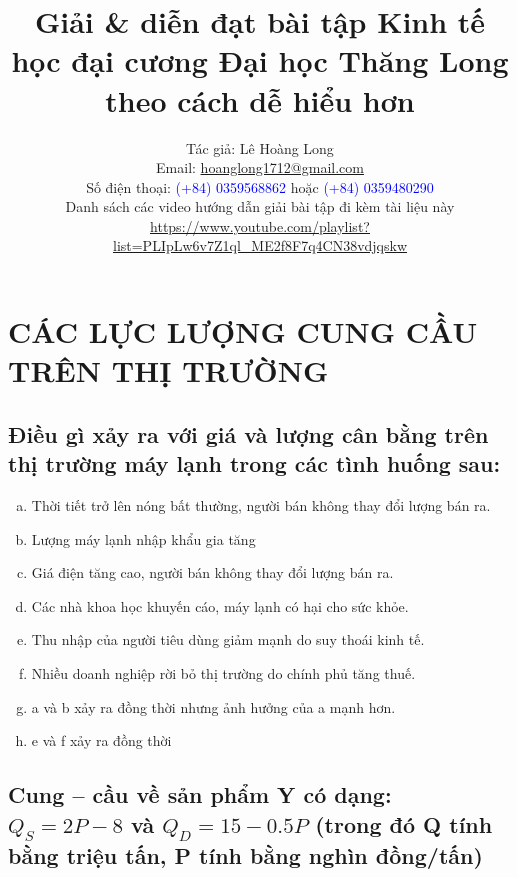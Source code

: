 \documentclass{report}
\title{Giải \& diễn đạt bài tập Kinh tế học đại cương Đại học Thăng Long theo cách dễ hiểu hơn
}
\author{Tác giả: Lê Hoàng Long \\ Email: \href{mailto:hoanglong1712@gmail.com}{hoanglong1712@gmail.com} 
\\ Số điện thoại: \textcolor{blue}{(+84) 0359568862} 
hoặc \textcolor{blue}{(+84) 0359480290} \\
Danh sách các video hướng dẫn giải bài tập đi kèm tài liệu này \\
 \url{https://www.youtube.com/playlist?list=PLIpLw6v7Z1ql_ME2f8F7q4CN38vdjqskw} }
\date{ }
\begin{document}
\maketitle

\tableofcontents

\setcounter{chapter}{2}
\chapter{CÁC LỰC LƯỢNG 
CUNG CẦU TRÊN THỊ 
TRƯỜNG}

\section{Điều gì xảy ra với giá và lượng cân bằng trên thị trường máy lạnh trong các
  tình huống sau:}

\begin{enumerate}[(a)]
    \item Thời tiết trở lên nóng bất thường, người bán không thay đổi lượng bán ra.
    \item  Lượng máy lạnh nhập khẩu gia tăng
    \item  Giá điện tăng cao, người bán không thay đổi lượng bán ra.
    \item  Các nhà khoa học khuyến cáo, máy lạnh có hại cho sức khỏe.
    \item  Thu nhập của người tiêu dùng giảm mạnh do suy thoái kinh tế.
    \item  Nhiều doanh nghiệp rời bỏ thị trường do chính phủ tăng thuế.
    \item  a và b xảy ra đồng thời nhưng ảnh hưởng của a mạnh hơn.
    \item  e và f xảy ra đồng thời
\end{enumerate}

\section{Cung – cầu về sản phẩm Y có dạng: $Q_S = 2P - 8$ và $Q_D = 15 - 0.5P$
  (trong đó Q tính bằng triệu tấn, P tính bằng nghìn đồng/tấn)}
\end{document}
